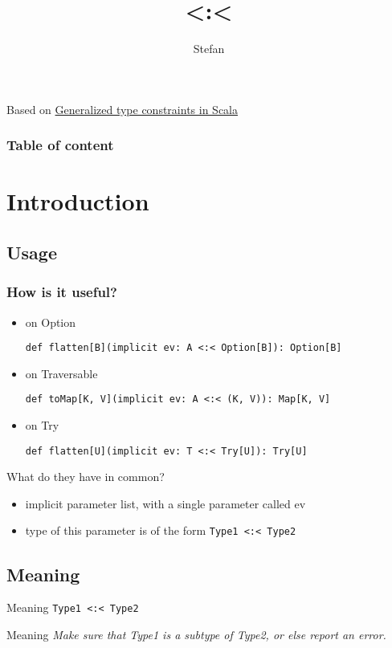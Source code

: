 \documentclass[11pt]{beamer}
\author{Stefan}
\title{\textless:\textless}
\date{}
\begin{document}
\begin{frame}
\titlepage
Based on \href{http://blog.bruchez.name/2015/11/generalized-type-constraints-in-scala.html}{Generalized type constraints in Scala}
\end{frame}

\begin{frame} 
	\frametitle{Table of content} 
	\tableofcontents 
\end{frame}

\section{Introduction} 
\subsection{Usage}

\begin{frame}[fragile]
\frametitle{How is it useful?}
\begin{itemize}
\item on Option
\begin{lstlisting} 
def flatten[B](implicit ev: A <:< Option[B]): Option[B]
\end{lstlisting} %

\item on Traversable
\begin{lstlisting} 
def toMap[K, V](implicit ev: A <:< (K, V)): Map[K, V]
\end{lstlisting} %

\item on Try
\begin{lstlisting} 
def flatten[U](implicit ev: T <:< Try[U]): Try[U]
\end{lstlisting} 
\end{itemize}
\end{frame}

\begin{frame}{What do they have in common?}
\begin{itemize}
\item implicit parameter list, with a single parameter called ev
\item type of this parameter is of the form \lstinline{Type1 <:< Type2}
\end{itemize}
\end{frame}


\subsection{Meaning}
\begin{frame}[fragile]{Meaning}
\lstinline {Type1 <:< Type2} \newline\newline
\begin{block}{Meaning} %
\textit{Make sure that Type1 is a subtype of Type2, or else report an error.}
\end{block}
\end{frame}
\end{document}
